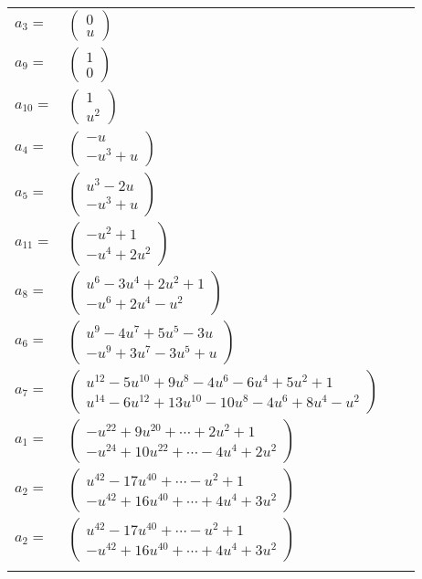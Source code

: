 \documentclass[1p]{elsarticle_modified}
\theoremstyle{definition}
\begin{document}
\begin{tabular}{m{7pt} m{180pt} m{7pt} m{180pt} }
\flushright $a_{3}=$&$\begin{pmatrix}0\\u\end{pmatrix}$ \\
\flushright $a_{9}=$&$\begin{pmatrix}1\\0\end{pmatrix}$ \\
\flushright $a_{10}=$&$\begin{pmatrix}1\\u^2\end{pmatrix}$ \\
\flushright $a_{4}=$&$\begin{pmatrix}- u\\- u^3+u\end{pmatrix}$ \\
\flushright $a_{5}=$&$\begin{pmatrix}u^3-2 u\\- u^3+u\end{pmatrix}$ \\
\flushright $a_{11}=$&$\begin{pmatrix}- u^2+1\\- u^4+2 u^2\end{pmatrix}$ \\
\flushright $a_{8}=$&$\begin{pmatrix}u^6-3 u^4+2 u^2+1\\- u^6+2 u^4- u^2\end{pmatrix}$ \\
\flushright $a_{6}=$&$\begin{pmatrix}u^9-4 u^7+5 u^5-3 u\\- u^9+3 u^7-3 u^5+u\end{pmatrix}$ \\
\flushright $a_{7}=$&$\begin{pmatrix}u^{12}-5 u^{10}+9 u^8-4 u^6-6 u^4+5 u^2+1\\u^{14}-6 u^{12}+13 u^{10}-10 u^8-4 u^6+8 u^4- u^2\end{pmatrix}$ \\
\flushright $a_{1}=$&$\begin{pmatrix}- u^{22}+9 u^{20}+\cdots+2 u^2+1\\- u^{24}+10 u^{22}+\cdots-4 u^4+2 u^2\end{pmatrix}$ \\
\flushright $a_{2}=$&$\begin{pmatrix}u^{42}-17 u^{40}+\cdots- u^2+1\\- u^{42}+16 u^{40}+\cdots+4 u^4+3 u^2\end{pmatrix}$\\ \flushright $a_{2}=$&$\begin{pmatrix}u^{42}-17 u^{40}+\cdots- u^2+1\\- u^{42}+16 u^{40}+\cdots+4 u^4+3 u^2\end{pmatrix}$\\&\end{tabular}
\end{document}
